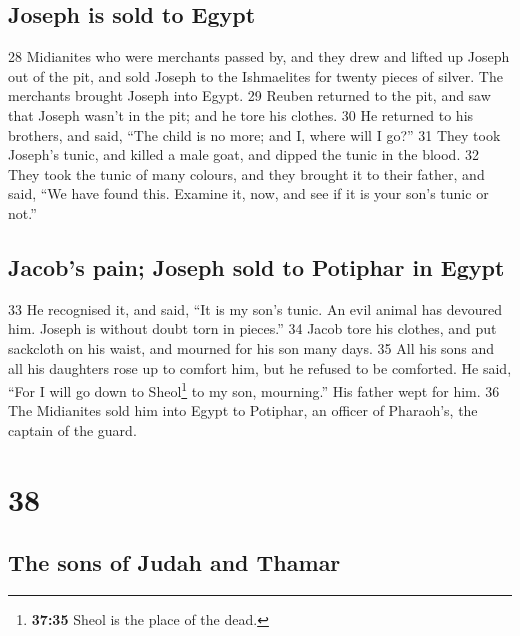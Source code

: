 \hypertarget{joseph-is-sold-to-egypt}{%
\subsection{Joseph is sold to Egypt}\label{joseph-is-sold-to-egypt}}

{28} Midianites who were merchants passed by, and they drew and lifted
up Joseph out of the pit, and sold Joseph to the Ishmaelites for twenty
pieces of silver. The merchants brought Joseph into Egypt. {29} Reuben
returned to the pit, and saw that Joseph wasn't in the pit; and he tore
his clothes. {30} He returned to his brothers, and said, ``The child is
no more; and I, where will I go?'' {31} They took Joseph's tunic, and
killed a male goat, and dipped the tunic in the blood. {32} They took
the tunic of many colours, and they brought it to their father, and
said, ``We have found this. Examine it, now, and see if it is your son's
tunic or not.''

\hypertarget{jacobs-pain-joseph-sold-to-potiphar-in-egypt}{%
\subsection{Jacob's pain; Joseph sold to Potiphar in
Egypt}\label{jacobs-pain-joseph-sold-to-potiphar-in-egypt}}

{33} He recognised it, and said, ``It is my son's tunic. An evil animal
has devoured him. Joseph is without doubt torn in pieces.'' {34} Jacob
tore his clothes, and put sackcloth on his waist, and mourned for his
son many days. {35} All his sons and all his daughters rose up to
comfort him, but he refused to be comforted. He said, ``For I will go
down to Sheol\footnote{\textbf{37:35} Sheol is the place of the dead.}
to my son, mourning.'' His father wept for him. {36} The Midianites sold
him into Egypt to Potiphar, an officer of Pharaoh's, the captain of the
guard.

\hypertarget{section-37}{%
\section{38}\label{section-37}}

\hypertarget{the-sons-of-judah-and-thamar}{%
\subsection{The sons of Judah and
Thamar}\label{the-sons-of-judah-and-thamar}}


